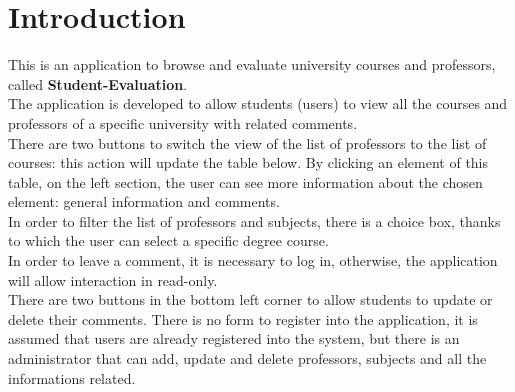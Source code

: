 \documentclass[a4paper, oneside]{article}
\begin{document}
\baselineskip 13pt
	
\begin{frontespizio} 
 \Preambolo{\renewcommand{\frontpretitlefont}{\fontsize{15}{12}\scshape}}
\Rientro {1cm}
 \Punteggiatura {}
\end{frontespizio}

\clearpage

	\tableofcontents\thispagestyle{empty}
	\clearpage


\section{Introduction}
This is an application to browse and evaluate university courses and professors, called \textbf{Student-Evaluation}.\\
The application is developed to allow students (users) to view all the courses and professors of a specific university with related comments.\\ 
There are two buttons to switch the view of the list of professors to the list of courses: this action will update the table below. By clicking an element of this table, on the left section, the user can see more information about the chosen element: general information and comments.\\ 
In order to filter the list of professors and subjects, there is a choice box, thanks to which the user can select a specific degree course. \\
In order to leave a comment, it is necessary to log in, otherwise, the application will allow interaction in read-only.\\
There are two buttons in the bottom left corner to allow students to update or delete their comments.
There is no form to register into the application, it is assumed that users are already registered into the system, but there is an administrator that can add, update and delete professors, subjects and  all the informations related.
\end{document}
